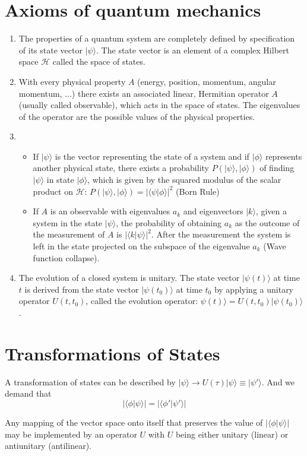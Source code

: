 \documentclass[cyan]{elegantnote}
\begin{document}
\section{Axioms of quantum mechanics}
\begin{enumerate}
\item  The properties of a quantum system are completely defined by specification of its state vector $|\psi\rangle$. The state vector is an element of a complex Hilbert space $\mathcal{H}$ called the space of states.
\item With every physical property $A$ (energy, position, momentum, angular momentum, ...) there exists an associated linear, Hermitian operator $A$ (usually called observable), which acts in the space of states. The eigenvalues of the operator are the possible values of the physical properties.
\item 
\begin{itemize}
\item  If $|\psi\rangle$ is the vector representing the state of a system and if $|\phi\rangle$ represents another physical state, there exists a probability $P(|\psi\rangle,|\phi\rangle)$ of finding $|\psi\rangle$ in state $|\phi\rangle$, which is given by the squared modulus of the scalar product on $\mathcal{H}: \, P(|\psi\rangle,|\phi\rangle) = |\langle \psi | \phi \rangle|^2$ (Born Rule)
\item If $A$ is an observable with eigenvalues $a_k$ and eigenvectors $|k\rangle$, given a system in the state $|\psi\rangle$, the probability of obtaining $a_k$ as the outcome of the measurement of $A$ is $|\langle k | \psi \rangle|^2$. After the measurement
the system is left in the state projected on the subspace of the eigenvalue $a_k$ (Wave function collapse).
\end{itemize}
\item The evolution of a closed system is unitary. The state vector $|\psi(t)\rangle$ at time $t$ is derived from the state vector $|\psi(t_0)\rangle$ at time $t_0$ by applying a unitary operator $U(t,t_0)$, called the evolution operator: $\psi(t)\rangle = U(t,t_0) |\psi(t_0)\rangle$.
\end{enumerate}

\section{Transformations of States}
A transformation of states can be described by $|\psi\rangle \to U(\tau) | \psi \rangle \equiv | \psi' \rangle$. And we demand that
\[|\langle \phi | \psi \rangle| = |\langle \phi' | \psi' \rangle|\]
\begin{newthem}
Any mapping of the vector space onto itself that preserves the value of $|\langle \phi | \psi \rangle|$ may be implemented by an operator $U$ with $U$ being either unitary (linear) or antiunitary (antilinear).
\end{newthem}
\end{document}

